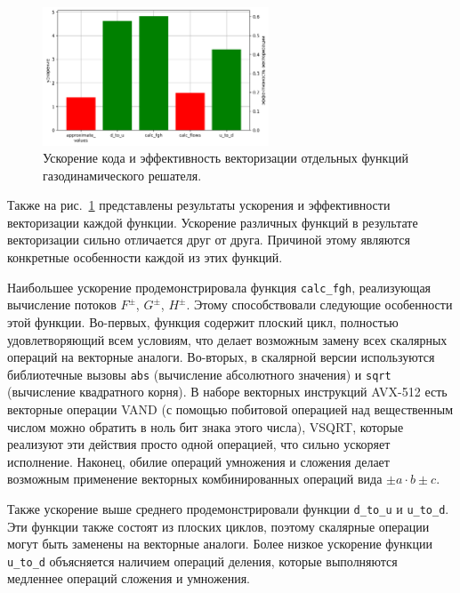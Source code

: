 \begin{figure}[ht]
\centering
\includegraphics[width=0.6\textwidth]{./fig/vec_ibm_diagr2.png}
\singlespacing
{}\caption{Ускорение кода и эффективность векторизации отдельных функций газодинамического решателя.}
\label{fig:text_4_ibm_diagr2}
\end{figure}

Также на рис.~\ref{fig:text_4_ibm_diagr2} представлены результаты ускорения и эффективности векторизации каждой функции.
Ускорение различных функций в результате векторизации сильно отличается друг от друга.
Причиной этому являются конкретные особенности каждой из этих функций.

Наибольшее ускорение продемонстрировала функция \texttt{calc\_fgh}, реализующая вычисление потоков $F^{\pm}$, $G^{\pm}$, $H^{\pm}$.
Этому способствовали следующие особенности этой функции.
Во-первых, функция содержит плоский цикл, полностью удовлетворяющий всем условиям, что делает возможным замену всех скалярных операций на векторные аналоги.
Во-вторых, в скалярной версии используются библиотечные вызовы \texttt{abs} (вычисление абсолютного значения) и \texttt{sqrt} (вычисление квадратного корня).
В наборе векторных инструкций AVX-512 есть векторные операции VAND (с помощью побитовой операцией над вещественным числом можно обратить в ноль бит знака этого числа), VSQRT, которые реализуют эти действия просто одной операцией, что сильно ускоряет исполнение.
Наконец, обилие операций умножения и сложения делает возможным применение векторных комбинированных операций вида $\pm a \cdot b \pm c$.

Также ускорение выше среднего продемонстрировали функции \texttt{d\_to\_u} и \texttt{u\_to\_d}.
Эти функции также состоят из плоских циклов, поэтому скалярные операции могут быть заменены на векторные аналоги.
Более низкое ускорение функции \texttt{u\_to\_d} объясняется наличием операций деления, которые выполняются медленнее операций сложения и умножения.

